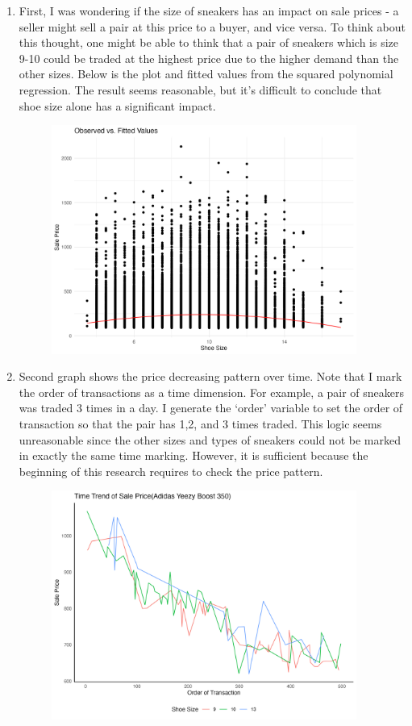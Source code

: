 \documentclass{article}
\begin{document}
\begin{large}
\begin{enumerate}
	\item First, I was wondering if the size of sneakers has an impact on sale prices - a seller might sell a pair at this price to a buyer, and vice versa. To think about this thought, one might be able to think that a pair of sneakers which is size 9-10 could be traded at the highest price due to the higher demand than the other sizes. Below is the plot and fitted values from the squared polynomial regression. The result seems reasonable, but it's difficult to conclude that shoe size alone has a significant impact.
	\begin{figure}[h]
		\centering
		\includegraphics[width = 100mm]{PS6a_Oh.png}
	\end{figure}
	\item Second graph shows the price decreasing pattern over time. Note that I mark the order of transactions as a time dimension. For example, a pair of sneakers was traded 3 times in a day. I generate the `order' variable to set the order of transaction so that the pair has 1,2, and 3 times traded. This logic seems unreasonable since the other sizes and types of sneakers could not be marked in exactly the same time marking. However, it is sufficient because the beginning of this research requires to check the price pattern.
	\begin{figure}[h]
		\centering
		\includegraphics[width = 100mm]{PS6b_Oh.png}

\end{figure}
\end{enumerate}
\end{large}
\end{document}
